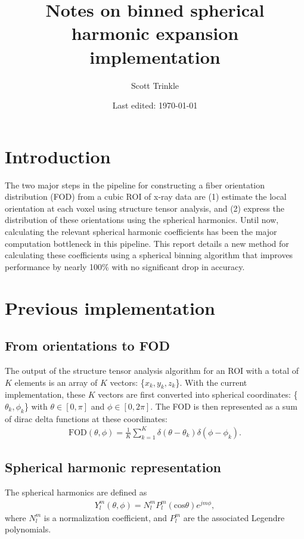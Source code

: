 \documentclass{article}
\title{Notes on binned spherical harmonic expansion implementation}
\author{Scott Trinkle}
\date{Last edited: \today}
\begin{document}
\maketitle

\section{Introduction}
The two major steps in the pipeline for constructing a fiber orientation
distribution (FOD) from a cubic ROI of x-ray \uct data are (1) estimate the
local orientation at each voxel using structure tensor analysis, and (2) express
the distribution of these orientations using the spherical harmonics. Until now,
calculating the relevant spherical harmonic coefficients has been the major
computation bottleneck in this pipeline. This report details a new method for
calculating these coefficients using a spherical binning algorithm that improves
performance by nearly 100\% with no significant drop in accuracy.

\section{Previous implementation}
\subsection{From orientations to FOD}
The output of the structure tensor analysis algorithm for an ROI with a total of
$K$ elements is an array of $K$ vectors: \{$x_k, y_k, z_k$\}. With the current
implementation, these $K$ vectors are first converted into spherical
coordinates: \{$\theta_k, \phi_k$\} with $\theta \in [0, \pi]$ and
$\phi \in [0, 2\pi]$. The FOD is then represented as a sum of dirac delta
functions at these coordinates:
\begin{align}
  \label{eq:1}
  \text{FOD}(\theta, \phi) = \frac{1}{K}\sum_{k=1}^K \delta(\theta - \theta_k)\delta(\phi - \phi_k).
\end{align}

\subsection{Spherical harmonic representation}
The spherical harmonics are defined as
\begin{align}
  Y_l^m(\theta, \phi) = N_l^m P_l^m(\text{cos}\theta)e^{jm\phi},
\end{align}
where $N_l^m$ is a normalization coefficient, and $P_l^m$ are the
associated Legendre polynomials.
\end{document}
